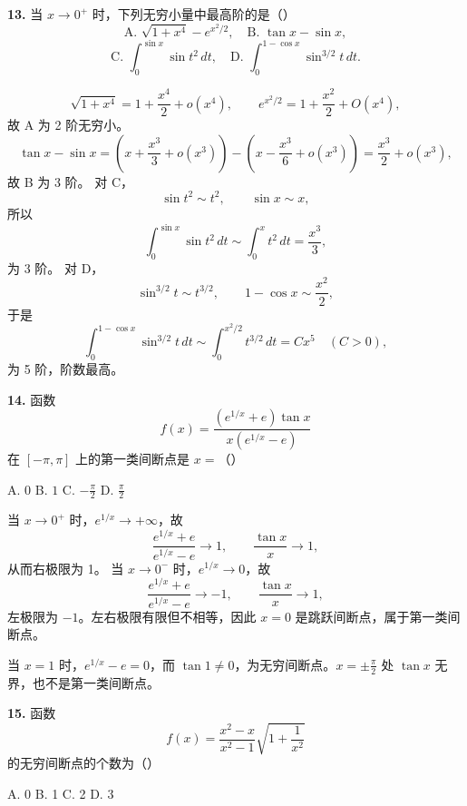 \begin{problemblock}
\textbf{13.} 当 \(x\to0^+\) 时，下列无穷小量中最高阶的是（\quad）
\[
\text{A. }\sqrt{1+x^4}-e^{x^2/2},\quad
\text{B. }\tan x-\sin x,
\]
\[
\text{C. }\int_0^{\sin x}\sin t^2\,dt,\quad
\text{D. }\int_0^{1-\cos x}\sin^{3/2}t\,dt.
\]
\end{problemblock}

\begin{solutionblock}
\[
\sqrt{1+x^4}=1+\frac{x^4}{2}+o(x^4),\qquad
e^{x^2/2}=1+\frac{x^2}{2}+O(x^4),
\]
故 A 为 2 阶无穷小。
\[
\tan x-\sin x
=\left(x+\frac{x^3}{3}+o(x^3)\right)
-\left(x-\frac{x^3}{6}+o(x^3)\right)
=\frac{x^3}{2}+o(x^3),
\]
故 B 为 3 阶。
对 C，
\[
\sin t^2\sim t^2,\qquad \sin x\sim x,
\]
所以
\[
\int_0^{\sin x}\sin t^2\,dt
\sim\int_0^x t^2\,dt=\frac{x^3}{3},
\]
为 3 阶。
对 D，
\[
\sin^{3/2}t\sim t^{3/2},\qquad 1-\cos x\sim\frac{x^2}{2},
\]
于是
\[
\int_0^{1-\cos x}\sin^{3/2}t\,dt
\sim\int_0^{x^2/2}t^{3/2}\,dt
=C x^5\quad(C>0),
\]
为 5 阶，阶数最高。

\end{solutionblock}

\begin{problemblock}
\textbf{14.} 函数
\[
f(x)=\frac{(e^{1/x}+e)\tan x}{x(e^{1/x}-e)}
\]
在 \([-\pi,\pi]\) 上的第一类间断点是 \(x=\)（\quad）

A. \(0\) \qquad B. \(1\) \qquad C. \(-\frac{\pi}{2}\) \qquad D. \(\frac{\pi}{2}\)
\end{problemblock}

\begin{solutionblock}
当 \(x\to0^+\) 时，\(e^{1/x}\to+\infty\)，故
\[
\frac{e^{1/x}+e}{e^{1/x}-e}\to1,\qquad \frac{\tan x}{x}\to1,
\]
从而右极限为 1。
当 \(x\to0^-\) 时，\(e^{1/x}\to0\)，故
\[
\frac{e^{1/x}+e}{e^{1/x}-e}\to -1,\qquad \frac{\tan x}{x}\to1,
\]
左极限为 \(-1\)。左右极限有限但不相等，因此 \(x=0\) 是跳跃间断点，属于第一类间断点。

当 \(x=1\) 时，\(e^{1/x}-e=0\)，而 \(\tan1\ne0\)，为无穷间断点。\(x=\pm\frac{\pi}{2}\) 处 \(\tan x\) 无界，也不是第一类间断点。

\end{solutionblock}

\begin{problemblock}
\textbf{15.} 函数
\[
f(x)=\frac{x^2-x}{x^2-1}\sqrt{1+\frac1{x^2}}
\]
的无穷间断点的个数为（\quad）

A. 0 \qquad B. 1 \qquad C. 2 \qquad D. 3
\end{problemblock}

